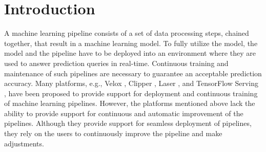 

\section{Introduction} \label{introduction}
A machine learning pipeline consists of a set of data processing steps, chained together, that result in a machine learning model.
To fully utilize the model,  the model and the pipeline have to be deployed into an environment where they are used to answer prediction queries in real-time.
Continuous training and maintenance of such pipelines are necessary to guarantee an acceptable prediction accuracy.
Many platforms, e.g., Velox \cite{crankshaw2014missing}, Clipper \cite{crankshaw2016clipper}, Laser \cite{agarwal2014laser}, and TensorFlow Serving \cite{abadi2016tensorflow}, have been proposed to provide support for deployment and continuous training of machine learning pipelines. 
However, the platforms mentioned above lack the ability to provide support for continuous and automatic improvement of the pipelines.
Although they provide support for seamless deployment of pipelines, they rely on the users to continuously improve the pipeline and make adjustments.

